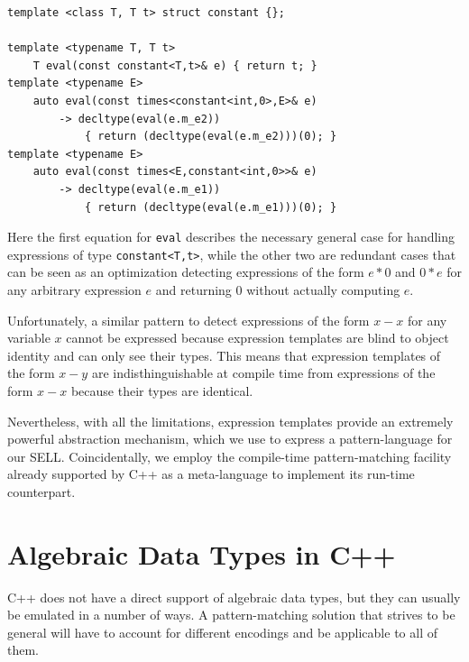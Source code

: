 \documentclass[preprint]{sigplanconf}
\makeatletter
\DeclareRobustCommand{\code}[1]{{\lstinline[breaklines=false,escapechar=@]{#1}}}
\makeatother
\begin{document}
\begin{lstlisting}[keepspaces,columns=flexible]
template <class T, T t> struct constant {};

template <typename T, T t>
    T eval(const constant<T,t>& e) { return t; }
template <typename E>
    auto eval(const times<constant<int,0>,E>& e) 
        -> decltype(eval(e.m_e2)) 
            { return (decltype(eval(e.m_e2)))(0); }
template <typename E>
    auto eval(const times<E,constant<int,0>>& e) 
        -> decltype(eval(e.m_e1)) 
            { return (decltype(eval(e.m_e1)))(0); }
\end{lstlisting}

\noindent Here the first equation for \code{eval} describes the necessary general 
case for handling expressions of type \code{constant<T,t>}, while the other two 
are redundant cases that can be seen as an optimization detecting expressions of 
the form $e*0$ and $0*e$ for any arbitrary expression $e$ and returning 0 
without actually computing $e$.

Unfortunately, a similar pattern to detect expressions of the form $x-x$ for any 
variable $x$ cannot be expressed because expression templates are blind to 
object identity and can only see their types. This means that expression 
templates of the form $x-y$ are indisthinguishable at compile time from 
expressions of the form $x-x$ because their types are identical.

Nevertheless, with all the limitations, expression templates provide an 
extremely powerful abstraction mechanism, which we use to express a 
pattern-language for our SELL. Coincidentally, we employ the compile-time 
pattern-matching facility already supported by C++ as a meta-language to 
implement its run-time counterpart.


\section{Algebraic Data Types in C++}
\label{sec:adt}

C++ does not have a direct support of algebraic data types, but they can usually 
be emulated in a number of ways. A pattern-matching solution that strives to be 
general will have to account for different encodings and be applicable to all of 
them.
\end{document}
